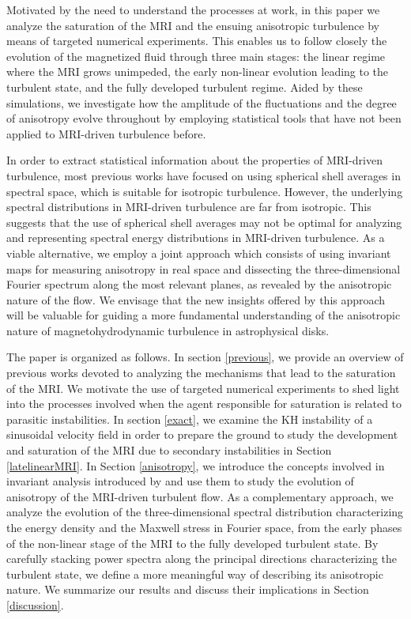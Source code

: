 \documentclass[]{emulateapj}
\begin{document}
Motivated by the need to understand the processes at work, in this
paper we analyze the saturation of the MRI and the ensuing anisotropic
turbulence by means of targeted numerical experiments.
This enables us to follow closely the evolution of the magnetized fluid
through three main stages: the linear regime where the MRI grows
unimpeded, the early non-linear evolution leading to the turbulent
state, and the fully developed turbulent regime.  Aided by these
simulations, we investigate how the amplitude of the fluctuations and
the degree of anisotropy evolve throughout by employing statistical
tools that have not been applied to MRI-driven turbulence before.

In order to extract statistical information about the properties of
MRI-driven turbulence, most previous works have focused on using spherical 
shell averages in spectral space, which is suitable for isotropic turbulence. 
However, the underlying spectral distributions in MRI-driven turbulence are
far from isotropic. This suggests that the use of spherical shell averages may
not be optimal for analyzing and representing spectral energy
distributions in MRI-driven turbulence. As a viable alternative, we employ a joint approach
which consists of using invariant maps for measuring anisotropy in
real space and dissecting the three-dimensional Fourier spectrum along the 
most relevant planes, as revealed by the anisotropic nature of the flow. 
We envisage that the new insights offered by this approach will be valuable 
for guiding a more fundamental understanding of the anisotropic nature of
magnetohydrodynamic turbulence in astrophysical disks.

The paper is organized as follows. In section \ref{previous}, we
provide an overview of previous works devoted to analyzing the
mechanisms that lead to the saturation of the MRI. We motivate 
the use of targeted numerical experiments to shed light into the
processes involved when the agent responsible for saturation is
related to parasitic instabilities. In section \ref{exact}, we examine
the KH instability of a sinusoidal velocity field in order to prepare
the ground to study the development and saturation of the MRI due to
secondary instabilities in Section \ref{latelinearMRI}.  In Section \ref{anisotropy},
we introduce the concepts involved in invariant analysis introduced by
\cite{1977JFM....82..161L} and use them to study the evolution of anisotropy 
of the MRI-driven turbulent flow.  As a complementary approach, we analyze the 
evolution of the three-dimensional spectral distribution characterizing the energy density
and the Maxwell stress in Fourier space, from the early phases of the non-linear 
stage of the MRI to the fully developed turbulent state. 
By carefully stacking power spectra along the principal directions characterizing the
turbulent state, we define a more meaningful way of describing its anisotropic nature. 
We summarize our results and discuss their implications in Section  \ref{discussion}.
\end{document}

